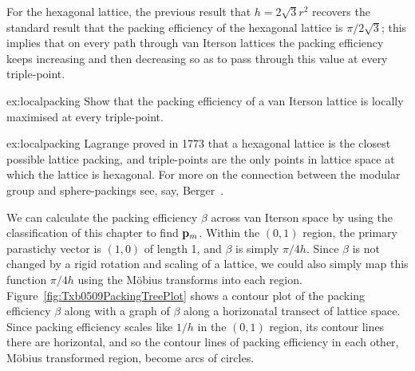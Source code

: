 For the hexagonal lattice, the previous result that $h= 2\sqrt{3} r^2$ 
recovers the standard result that the packing efficiency of the hexagonal lattice is $\pi/2\sqrt{3}$; this implies that on every path through van Iterson lattices the packing efficiency keeps increasing and then decreasing so as to pass through this value at every triple-point.  
\begin{jExercise}{ex:localpacking}
Show that the packing efficiency of a van Iterson lattice is locally maximised at every triple-point.
\end{jExercise}
\begin{jAnswer}{ex:localpacking}
	Lagrange proved in 1773 that a hexagonal lattice is the closest possible lattice packing, and triple-points are the only points in lattice space at which the lattice is hexagonal. For more on the connection between the modular group and sphere-packings see, say, Berger~\cite{bergerGeometryRevealedJacob2010}.
\end{jAnswer}
We can calculate the packing efficiency $\beta$ across van Iterson space by using the classification of this chapter to find ${\mathbf p}_{m}$.  Within the $(0,1)$ region, the primary parastichy vector is $(1,0)$ of length 1, and $\beta$ is simply $\pi/ {4 h }$.  Since $\beta$ is not changed by a rigid rotation and scaling of a lattice, we could also simply map this function  $\pi/ {4 h }$ using the M{\"o}bius transforms into each region. Figure~\ref{fig:Txb0509PackingTreePlot} shows a contour plot of the packing efficiency $\beta$ along with a graph of $\beta$ along a horizonatal transect of lattice space.
%
Since packing efficiency scales like $1/h$ in the $(0,1)$ region, its contour lines there are horizontal, and so the contour lines of packing efficiency in each other, M{\"o}bius transformed region, become arcs of circles. 

